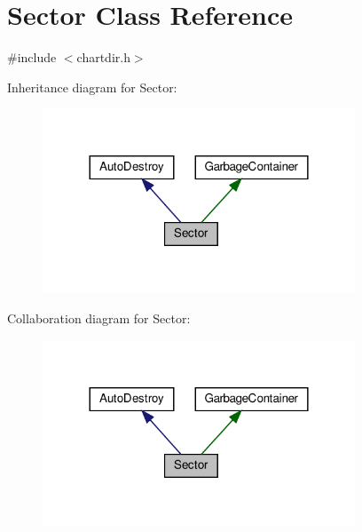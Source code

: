 \hypertarget{class_sector}{}\section{Sector Class Reference}
\label{class_sector}


{\ttfamily \#include $<$chartdir.\+h$>$}



Inheritance diagram for Sector\+:
\nopagebreak
\begin{figure}[H]
\begin{center}
\leavevmode
\includegraphics[width=264pt]{class_sector__inherit__graph}
\end{center}
\end{figure}


Collaboration diagram for Sector\+:
\nopagebreak
\begin{figure}[H]
\begin{center}
\leavevmode
\includegraphics[width=264pt]{class_sector__coll__graph}
\end{center}
\end{figure}
